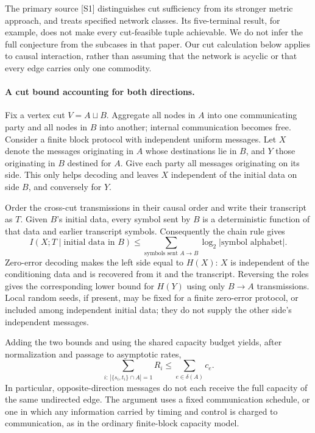\documentclass[11pt]{article}
\begin{document}
The primary source [S1] distinguishes cut sufficiency from its stronger metric approach, and treats specified network classes. Its five-terminal result, for example, does not make every cut-feasible tuple achievable. We do not infer the full conjecture from the subcases in that paper. Our cut calculation below applies to causal interaction, rather than assuming that the network is acyclic or that every edge carries only one commodity.

\paragraph{A cut bound accounting for both directions.}
Fix a vertex cut $V=A\sqcup B$. Aggregate all nodes in $A$ into one communicating party and all nodes in $B$ into another; internal communication becomes free. Consider a finite block protocol with independent uniform messages. Let $X$ denote the messages originating in $A$ whose destinations lie in $B$, and $Y$ those originating in $B$ destined for $A$. Give each party all messages originating on its side. This only helps decoding and leaves $X$ independent of the initial data on side $B$, and conversely for $Y$.

Order the cross-cut transmissions in their causal order and write their transcript as $T$. Given $B$'s initial data, every symbol sent by $B$ is a deterministic function of that data and earlier transcript symbols. Consequently the chain rule gives
\[
 I(X;T\mid\text{initial data in }B)
 \le \sum_{\text{symbols sent }A\to B}\log_2|\text{symbol alphabet}|.
\]
Zero-error decoding makes the left side equal to $H(X)$: $X$ is independent of the conditioning data and is recovered from it and the transcript. Reversing the roles gives the corresponding lower bound for $H(Y)$ using only $B\to A$ transmissions. Local random seeds, if present, may be fixed for a finite zero-error protocol, or included among independent initial data; they do not supply the other side's independent messages.

Adding the two bounds and using the shared capacity budget yields, after normalization and passage to asymptotic rates,
\begin{equation}\label{a447:cut}
 \sum_{i:\,|\{s_i,t_i\}\cap A|=1}R_i
       \le \sum_{e\in\delta(A)}c_e.
\end{equation}
In particular, opposite-direction messages do not each receive the full capacity of the same undirected edge. The argument uses a fixed communication schedule, or one in which any information carried by timing and control is charged to communication, as in the ordinary finite-block capacity model.
\end{document}
